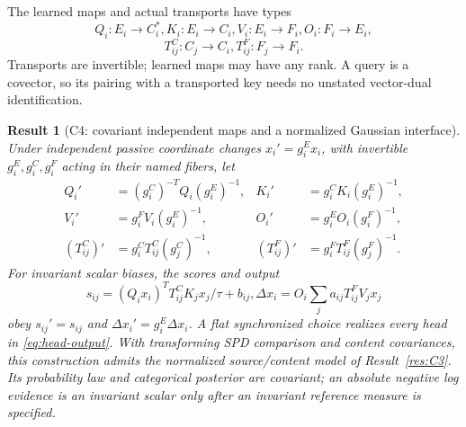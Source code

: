 \documentclass[11pt]{article}
\newtheorem{result}{Result}
\begin{document}
The learned maps and actual transports have types
\begin{equation}
Q_i:E_i\to C_i^*, K_i:E_i\to C_i,
V_i:E_i\to F_i, O_i:F_i\to E_i,
\label{eq:typed-maps}
\end{equation}
\begin{equation}
T^C_{ij}:C_j\to C_i, T^F_{ij}:F_j\to F_i.
\label{eq:typed-transports}
\end{equation}
Transports are invertible; learned maps may have any rank. A query is a covector, so its pairing with a transported key needs no unstated vector-dual identification.

\begin{result}[C4: covariant independent maps and a normalized Gaussian interface]
\label{res:C4}
Under independent passive coordinate changes $x_i'=g_i^Ex_i$, with invertible $g_i^E,g_i^C,g_i^F$ acting in their named fibers, let
\begin{align}
Q_i'&=(g_i^C)^{-T}Q_i(g_i^E)^{-1},& K_i'&=g_i^CK_i(g_i^E)^{-1},\\
V_i'&=g_i^FV_i(g_i^E)^{-1},& O_i'&=g_i^EO_i(g_i^F)^{-1},\\
(T^C_{ij})'&=g_i^CT^C_{ij}(g_j^C)^{-1},&
(T^F_{ij})'&=g_i^FT^F_{ij}(g_j^F)^{-1}.
\label{eq:gauge-laws}
\end{align}
For invariant scalar biases, the scores and output
\begin{equation}
s_{ij}=(Q_ix_i)^TT^C_{ij}K_jx_j/\tau+b_{ij},
\Delta x_i=O_i\sum_ja_{ij}T^F_{ij}V_jx_j
\label{eq:covariant-head}
\end{equation}
obey $s_{ij}'=s_{ij}$ and $\Delta x_i'=g_i^E\Delta x_i$. A flat synchronized choice realizes every head in \eqref{eq:head-output}. With transforming SPD comparison and content covariances, this construction admits the normalized source/content model of Result~\ref{res:C3}. Its probability law and categorical posterior are covariant; an absolute negative log evidence is an invariant scalar only after an invariant reference measure is specified.
\end{result}
\end{document}
